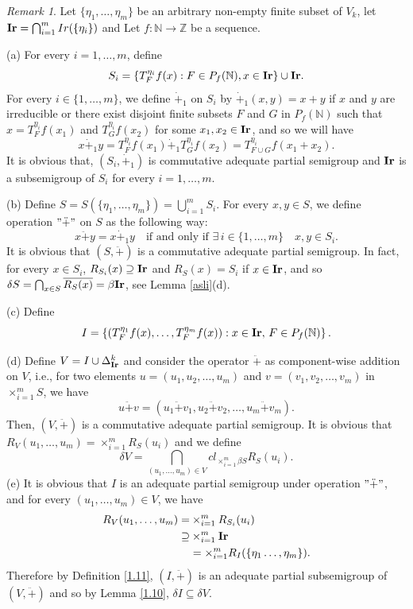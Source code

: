 \documentclass{amsart}
\theoremstyle{definition}
\theoremstyle{remark}
\newtheorem{remark}[theorem]{Remark}
\numberwithin{equation}{section}
\newcommand{\Ir}{{\bf{Ir}}}
\begin{document}
\begin{remark}
	Let $\{\eta_1,\ldots,\eta_m\}$ be an arbitrary non-empty finite subset of $V_k$, let $\Ir=\bigcap_{i=1}^m Ir(\{\eta_i\})$ and Let $f:\mathbb{N}\to\mathbb{Z}$ be a sequence.
	
(a)	 For every $i=1,\ldots,m$, define 
	\[
	S_i=\{T_F^{\eta_i}f(x):F\in P_f(\mathbb{N}), x\in \Ir\}\cup \Ir.
	\]
	 For every $i\in\{1,\ldots,m\}$, we define $\dot{+}_1$ on $S_i$ by $\dot{+}_1(x,y)=x+y$ if $x$ and $y$ are irreducible or there exist disjoint finite subsets $F$ and $G$ in $P_f(\mathbb{N})$ such that  $x=T_F^{\eta_i}f(x_1)$ and $T_G^{\eta_i}f(x_2)$ for some $x_1,x_2\in \Ir$, and so we will have  	 
	\[
x\dot{+}_1y=	T_F^{\eta_i}f(x_1)\dot{+}_1T_G^{\eta_i}f(x_2)=T^{\eta_i}_{F\cup G}f(x_1+x_2).
	\]
	It is obvious that, $(S_i,\dot{+}_1)$ is commutative adequate partial semigroup and \(\Ir\) is a subsemigroup of \(S_i\) for every $i=1,\ldots,m$.
	
(b) Define $S=S(\{\eta_1,\ldots,\eta_m\})=\bigcup_{i=1}^mS_i$. For every $x,y\in S$, we define operation $"\ddot{+}"$ on $S$ as the following way:
\[
x\ddot{+}y=x\dot{+}_1y\quad\mbox{if and only if }\exists\,i\in\{1,\ldots,m\}\quad x,y\in S_i.
\]
It is obvious that $(S,\ddot{+})$ is a commutative adequate partial semigroup. In fact, for every $x\in S_i$, $R_{S_i}(x)\supseteq\Ir$ and $R_S(x)=S_i$ if $x\in \Ir$, and so $\delta S=\bigcap_{x\in S}\overline{R_S(x)}=\beta\Ir$, see Lemma \ref{asli}(d).

(c) Define 
$$I=\left\{ \left(T_F^{\eta_1}f(x), \ldots, T_F^{\eta_m}f(x)\right) : x \in \Ir,\,F \in P_f(\mathbb{N}) \right\}.$$

(d) Define $V=I\cup \Delta_\Ir^k$ and consider the operator $\ddot{+}$ as component-wise addition on $V$, i.e., for two elements $u = (u_1, u_2, \dots, u_m)$ and $v = (v_1, v_2, \dots, v_m)$ in $\times_{i=1}^mS$, we have
\[
u \ddot{+} v = (u_1\ddot{+} v_1, u_2 \ddot{+} v_2, \dots, u_m \ddot{+} v_m).
\]
Then, $(V, \ddot{+})$ is a commutative adequate partial semigroup. It is obvious that $R_V(u_1,\ldots,u_m)=\times_{i=1}^mR_S(u_i)$ and we define 
\[
\delta V=\bigcap_{(u_1,\ldots,u_m)\in V}cl_{\times_{i=1}^m\beta S}R_S(u_i).
\]
(e) It is obvious that $I$ is an adequate partial semigroup under operation $"\ddot{+}"$, and for every $(u_1,\ldots,u_m)\in V$, we have 
\begin{align*}
R_V(u_1,\ldots,u_m)=&\times_{i=1}^mR_{S_i}(u_i)\\
\supseteq&\times_{i=1}^m\Ir\\
&=\times_{i=1}^mR_I(\{\eta_1\ldots,\eta_m\}).
\end{align*}
Therefore by Definition \ref{1.11}, $(I,\ddot{+})$ is an adequate partial subsemigroup of $(V,\ddot{+})$ and so by Lemma \ref{1.10}, $\delta I\subseteq \delta V$.


\end{remark}
\end{document}
